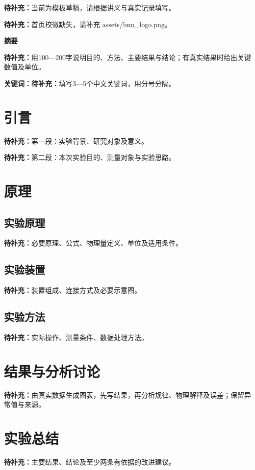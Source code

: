 \documentclass[UTF8,a4paper,11pt,fontset=fandol,scheme=plain]{ctexart}
\title{\ReportTitle}
\author{作者：\ReportBlank{2.4cm}\quad 学号：\ReportBlank{3.0cm}\\
        指导老师：\ReportBlank{2.0cm}\quad 实验时间：\ReportBlank{2.6cm}}
\date{}
\newcommand{\ReportTODO}[1]{\textbf{待补充：}#1}
\newif\ifReportLogo
\begin{document}
\maketitle\thispagestyle{plain}
\noindent\ReportTODO{当前为模板草稿，请根据讲义与真实记录填写。}
\ifReportLogo\else
  \par\noindent\ReportTODO{首页校徽缺失，请补充 assets/bnu_logo.png。}
\fi

\begin{center}\textbf{摘\quad 要}\end{center}
\ReportTODO{用100—200字说明目的、方法、主要结果与结论；有真实结果时给出关键数值及单位。}
\par\noindent\textbf{关键词：}\ReportTODO{填写3—5个中文关键词，用分号分隔。}

\section{引言}\label{sec:introduction}
\ReportTODO{第一段：实验背景、研究对象及意义。}

\ReportTODO{第二段：本次实验目的、测量对象与实验思路。}

\section{原理}\label{sec:principle}
\subsection{实验原理}
\ReportTODO{必要原理、公式、物理量定义、单位及适用条件。}
\subsection{实验装置}
\ReportTODO{装置组成、连接方式及必要示意图。}
\subsection{实验方法}
\ReportTODO{实际操作、测量条件、数据处理方法。}

\section{结果与分析讨论}\label{sec:results}
\ReportTODO{由真实数据生成图表，先写结果，再分析规律、物理解释及误差；保留异常值与来源。}

\section{实验总结}\label{sec:conclusion}
\ReportTODO{主要结果、结论及至少两条有依据的改进建议。}
\end{document}
